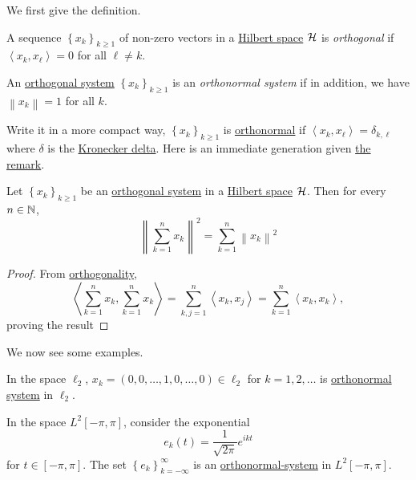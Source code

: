 We first give the definition.

\begin{definition}\label{def:orthogonal-system}
	A sequence \(\left\{ x_{k} \right\}_{k\geq 1} \) of non-zero vectors in a \hyperref[def:Hilbert-space]{Hilbert space} \(\mathcal{\MakeUppercase{h}} \) is \emph{orthogonal} if \(\left\langle x_{k} , x_{\ell} \right\rangle = 0\) for all \(\ell \neq k\).
\end{definition}

\begin{definition}\label{def:orthonormal-system}
	An \hyperref[def:orthogonal-system]{orthogonal system} \(\left\{ x_{k} \right\}_{k\geq 1} \) is an \emph{orthonormal system} if in addition, we have \(\left\lVert x_{k} \right\rVert= 1 \) for all \(k\).
\end{definition}

Write it in a more compact way, \(\left\{ x_{k} \right\}_{k\geq 1} \) is \hyperref[def:orthonormal-system]{orthonormal} if \(\left\langle x_{k} , x_{\ell } \right\rangle = \delta _{k, \ell } \) where \(\delta \) is the \href{https://en.wikipedia.org/wiki/Kronecker_delta}{Kronecker delta}. Here is an immediate generation given \hyperref[rmk:Pythagorean-theorem]{the remark}.
\begin{theorem}\label{thm:Pythagorean-theorem}
	Let \(\left\{ x_k \right\} _{k\geq 1}\) be an \hyperref[def:orthogonal-system]{orthogonal system} in a \hyperref[def:Hilbert-space]{Hilbert space} \(\mathcal{\MakeUppercase{h}} \). Then for every \(n \in \mathbb{\MakeUppercase{n}}\),
	\[
		\left\lVert \sum_{k=1} ^n x_k\right\rVert ^{2} = \sum_{k=1} ^n \left\lVert x_k\right\rVert ^{2}
	\]
\end{theorem}
\begin{proof}
	From \hyperref[def:orthogonal]{orthogonality},
	\[
		\left\langle \sum_{k=1} ^n x_k, \sum_{k=1} ^n x_k \right\rangle = \sum_{k, j= 1}^n \left\langle x_k, x_j \right\rangle  = \sum_{k=1} ^n \left\langle x_k, x_k \right\rangle,
	\]
	proving the result
\end{proof}

We now see some examples.

\begin{eg}
	In the space \(\ell _2\), \(x_{k} = (0, 0, \ldots , 1 , 0, \ldots , 0 )\in \ell _2\) for \(k = 1, 2, \ldots\) is \hyperref[def:orthonormal-system]{orthonormal system} in \(\ell _2\).
\end{eg}
\begin{eg}
	In the space \(L^2[-\pi , \pi ]\), consider the exponential
	\[
		e_k (t) = \frac{1}{\sqrt{2\pi } }e^{ikt}
	\]
	for \(t\in [-\pi , \pi ]\). The set \(\left\{ e_k \right\} _{k=-\infty }^{\infty} \) is an \hyperref[def:orthonormal-system]{orthonormal-system} in \(L^2[-\pi , \pi ]\).
\end{eg}

